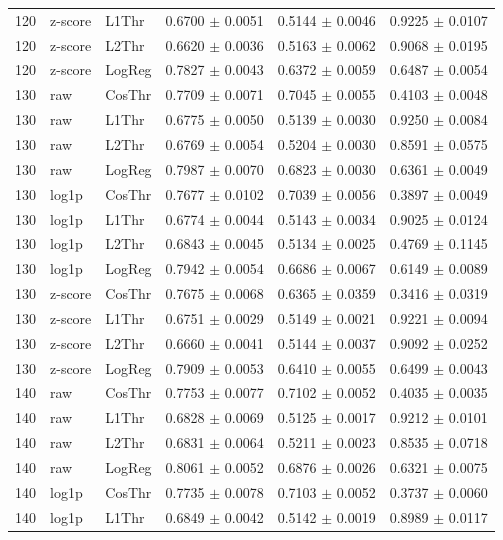 \begin{longtable}{rllccc}
120 & z-score & L1Thr & 0.6700 $\pm$ 0.0051 & 0.5144 $\pm$ 0.0046 & 0.9225 $\pm$ 0.0107 \\
120 & z-score & L2Thr & 0.6620 $\pm$ 0.0036 & 0.5163 $\pm$ 0.0062 & 0.9068 $\pm$ 0.0195 \\
120 & z-score & LogReg & 0.7827 $\pm$ 0.0043 & 0.6372 $\pm$ 0.0059 & 0.6487 $\pm$ 0.0054 \\
130 & raw & CosThr & 0.7709 $\pm$ 0.0071 & 0.7045 $\pm$ 0.0055 & 0.4103 $\pm$ 0.0048 \\
130 & raw & L1Thr & 0.6775 $\pm$ 0.0050 & 0.5139 $\pm$ 0.0030 & 0.9250 $\pm$ 0.0084 \\
130 & raw & L2Thr & 0.6769 $\pm$ 0.0054 & 0.5204 $\pm$ 0.0030 & 0.8591 $\pm$ 0.0575 \\
130 & raw & LogReg & 0.7987 $\pm$ 0.0070 & 0.6823 $\pm$ 0.0030 & 0.6361 $\pm$ 0.0049 \\
130 & log1p & CosThr & 0.7677 $\pm$ 0.0102 & 0.7039 $\pm$ 0.0056 & 0.3897 $\pm$ 0.0049 \\
130 & log1p & L1Thr & 0.6774 $\pm$ 0.0044 & 0.5143 $\pm$ 0.0034 & 0.9025 $\pm$ 0.0124 \\
130 & log1p & L2Thr & 0.6843 $\pm$ 0.0045 & 0.5134 $\pm$ 0.0025 & 0.4769 $\pm$ 0.1145 \\
130 & log1p & LogReg & 0.7942 $\pm$ 0.0054 & 0.6686 $\pm$ 0.0067 & 0.6149 $\pm$ 0.0089 \\
130 & z-score & CosThr & 0.7675 $\pm$ 0.0068 & 0.6365 $\pm$ 0.0359 & 0.3416 $\pm$ 0.0319 \\
130 & z-score & L1Thr & 0.6751 $\pm$ 0.0029 & 0.5149 $\pm$ 0.0021 & 0.9221 $\pm$ 0.0094 \\
130 & z-score & L2Thr & 0.6660 $\pm$ 0.0041 & 0.5144 $\pm$ 0.0037 & 0.9092 $\pm$ 0.0252 \\
130 & z-score & LogReg & 0.7909 $\pm$ 0.0053 & 0.6410 $\pm$ 0.0055 & 0.6499 $\pm$ 0.0043 \\
140 & raw & CosThr & 0.7753 $\pm$ 0.0077 & 0.7102 $\pm$ 0.0052 & 0.4035 $\pm$ 0.0035 \\
140 & raw & L1Thr & 0.6828 $\pm$ 0.0069 & 0.5125 $\pm$ 0.0017 & 0.9212 $\pm$ 0.0101 \\
140 & raw & L2Thr & 0.6831 $\pm$ 0.0064 & 0.5211 $\pm$ 0.0023 & 0.8535 $\pm$ 0.0718 \\
140 & raw & LogReg & 0.8061 $\pm$ 0.0052 & 0.6876 $\pm$ 0.0026 & 0.6321 $\pm$ 0.0075 \\
140 & log1p & CosThr & 0.7735 $\pm$ 0.0078 & 0.7103 $\pm$ 0.0052 & 0.3737 $\pm$ 0.0060 \\
140 & log1p & L1Thr & 0.6849 $\pm$ 0.0042 & 0.5142 $\pm$ 0.0019 & 0.8989 $\pm$ 0.0117 \\

\end{longtable}
